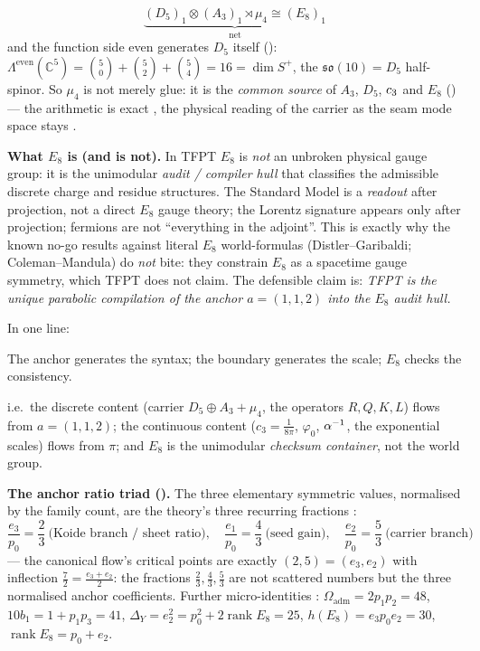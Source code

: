 \vspace{-3mm}
\[
  \underbrace{(D_5)_1\otimes(A_3)_1\rtimes\mu_4\cong(E_8)_1}_{\text{net}}
\]
and the function side even generates $D_5$ itself ():
$\Lambda^{\mathrm{even}}(\mathbb C^5)=\binom50+\binom52+\binom54=16=\dim S^+$, the $\mathfrak{so}(10)=D_5$
half-spinor. So $\mu_4$ is not merely glue: it is the \emph{common source} of $A_3$, $D_5$, $c_3$ and
$E_8$ () --- the arithmetic is exact \mE, the physical reading of the
carrier as the seam mode space stays \mC.
\par\smallskip
\noindent\textbf{What $E_8$ is (and is not).} In TFPT $E_8$ is \emph{not} an unbroken physical gauge group:
it is the unimodular \emph{audit / compiler hull} that classifies the admissible discrete charge and
residue structures. The Standard Model is a \emph{readout} after projection, not a direct $E_8$ gauge
theory; the Lorentz signature appears only after projection; fermions are not ``everything in the
adjoint''. This is exactly why the known no-go results against literal $E_8$ world-formulas
(Distler--Garibaldi; Coleman--Mandula) do \emph{not} bite: they constrain $E_8$ as a spacetime gauge
symmetry, which TFPT does not claim. The defensible claim is: \emph{TFPT is the unique parabolic
compilation of the anchor $a=(1,1,2)$ into the $E_8$ audit hull.}
\par\smallskip
\noindent In one line:
\begin{keyeq}
The anchor generates the syntax; the boundary generates the scale; $E_8$ checks the consistency.
\end{keyeq}
i.e.\ the discrete content (carrier $D_5\oplus A_3+\mu_4$, the operators $R,Q,K,L$) flows from
$a=(1,1,2)$; the continuous content ($c_3=\tfrac1{8\pi}$, $\varphi_0$, $\alpha^{-1}$, the exponential scales) flows
from $\pi$; and $E_8$ is the unimodular \emph{checksum container}, not the world group.
\par\smallskip
\noindent\textbf{The anchor ratio triad ().} The three elementary
symmetric values, normalised by the family count, are the theory's three recurring fractions \mE:
\[
  \frac{e_3}{p_0}=\frac23\ \text{(Koide branch / sheet ratio)},\quad
  \frac{e_1}{p_0}=\frac43\ \text{(seed gain)},\quad
  \frac{e_2}{p_0}=\frac53\ \text{(carrier branch)}
\]
--- the canonical flow's critical points are exactly $(2,5)=(e_3,e_2)$ with inflection
$\tfrac72=\tfrac{e_3+e_2}2$: the fractions $\tfrac23,\tfrac43,\tfrac53$ are not scattered numbers but the
three normalised anchor coefficients. Further micro-identities \mE:
$\Omega_{\mathrm{adm}}=2p_1p_2=48$, $10b_1=1+p_1p_3=41$,
$\Delta_Y=e_2^2=p_0^2+2\operatorname{rank}E_8=25$, $h(E_8)=e_3p_0e_2=30$,
$\operatorname{rank}E_8=p_0+e_2$.

